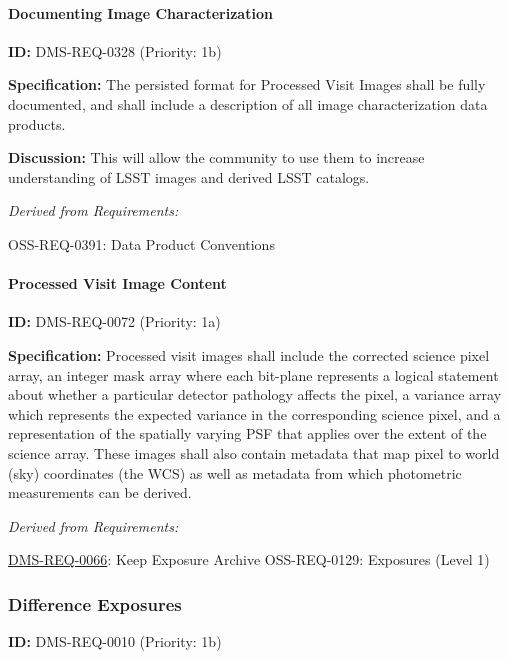 \documentclass[SE,toc,lsstdraft]{lsstdoc}
\begin{document}
\paragraph{Documenting Image Characterization}\hfill  %

\label{DMS-REQ-0328}
\textbf{ID:} DMS-REQ-0328 (Priority: 1b)

\textbf{Specification:} The persisted format for Processed Visit Images shall be fully documented, and shall include a description of all image characterization data products.

\textbf{Discussion:} This will allow the community to use them to increase understanding of LSST images and derived LSST catalogs.

\emph{Derived from Requirements:}

OSS-REQ-0391:
Data Product Conventions \newline

\paragraph{Processed Visit Image Content}\hfill  %

\label{DMS-REQ-0072}
\textbf{ID:} DMS-REQ-0072 (Priority: 1a)

\textbf{Specification:} Processed visit images shall include the corrected science pixel array, an integer mask array where each bit-plane represents a logical statement about whether a particular detector pathology affects the pixel, a variance array which represents the expected variance in the corresponding science pixel, and a representation of the spatially varying PSF that applies over the extent of the science array. These images shall also contain metadata that map pixel to world (sky) coordinates (the WCS) as well as metadata from which photometric measurements can be derived.

\emph{Derived from Requirements:}

\hyperref[DMS-REQ-0066]{DMS-REQ-0066}:
Keep Exposure Archive \newline
OSS-REQ-0129:
Exposures (Level 1) \newline

\subsubsection{Difference Exposures}

\label{DMS-REQ-0010}
\textbf{ID:} DMS-REQ-0010 (Priority: 1b)
\end{document}
